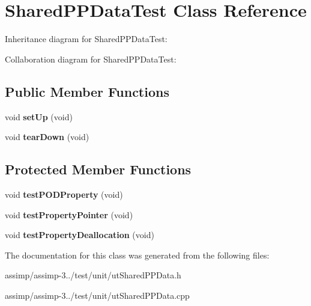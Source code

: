 \hypertarget{class_shared_p_p_data_test}{\section{Shared\+P\+P\+Data\+Test Class Reference}
\label{class_shared_p_p_data_test}
}


Inheritance diagram for Shared\+P\+P\+Data\+Test\+:


Collaboration diagram for Shared\+P\+P\+Data\+Test\+:
\subsection*{Public Member Functions}
\begin{DoxyCompactItemize}
\item 
\hypertarget{class_shared_p_p_data_test_afe9271863c89ecb24d026d15feac97ca}{void {\bfseries set\+Up} (void)}\label{class_shared_p_p_data_test_afe9271863c89ecb24d026d15feac97ca}

\item 
\hypertarget{class_shared_p_p_data_test_ab30b796565f2ac8f17e417f6352af82b}{void {\bfseries tear\+Down} (void)}\label{class_shared_p_p_data_test_ab30b796565f2ac8f17e417f6352af82b}

\end{DoxyCompactItemize}
\subsection*{Protected Member Functions}
\begin{DoxyCompactItemize}
\item 
\hypertarget{class_shared_p_p_data_test_a55ad86f8ed3da18938a00f96c791f9f2}{void {\bfseries test\+P\+O\+D\+Property} (void)}\label{class_shared_p_p_data_test_a55ad86f8ed3da18938a00f96c791f9f2}

\item 
\hypertarget{class_shared_p_p_data_test_a73897f6c9511c4cbdf0a5fd219931ec7}{void {\bfseries test\+Property\+Pointer} (void)}\label{class_shared_p_p_data_test_a73897f6c9511c4cbdf0a5fd219931ec7}

\item 
\hypertarget{class_shared_p_p_data_test_aa55a78b28c5bef17b0967efde7d48841}{void {\bfseries test\+Property\+Deallocation} (void)}\label{class_shared_p_p_data_test_aa55a78b28c5bef17b0967efde7d48841}

\end{DoxyCompactItemize}


The documentation for this class was generated from the following files\+:\begin{DoxyCompactItemize}
\item 
assimp/assimp-\/3../test/unit/ut\+Shared\+P\+P\+Data.\+h\item 
assimp/assimp-\/3../test/unit/ut\+Shared\+P\+P\+Data.\+cpp\end{DoxyCompactItemize}
